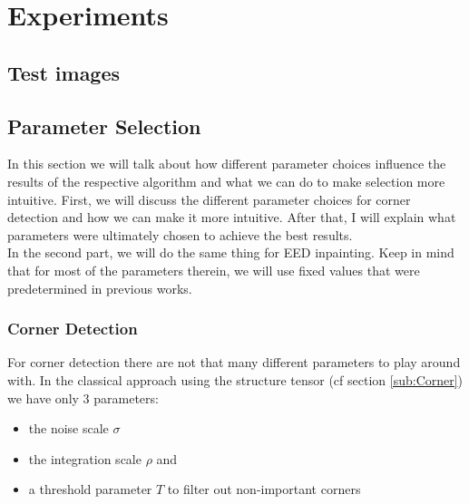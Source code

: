 \chapter{Experiments} 

\label{ch:Experiments} 
\section{Test images}

\section{Parameter Selection}
In this section we will talk about how different parameter choices influence the results of the
respective algorithm and what we can do to make selection more intuitive. First, we will discuss
the different parameter choices for corner detection and how we can make it more intuitive. After
that, I will explain what parameters were ultimately chosen to achieve the best results.\\
In the second part, we will do the same thing for EED inpainting. Keep in mind that for most of the
parameters therein, we will use fixed values that were predetermined in previous works.
\subsection{Corner Detection}
For corner detection there are not that many different parameters to play around with. In the
classical approach using the structure tensor (cf section \ref{sub:Corner}) we have only 3
parameters:
\begin{itemize}
    \item the noise scale $\sigma$
    \item the integration scale $\rho$ and
    \item a threshold parameter $T$ to filter out non-important corners
\end{itemize}


